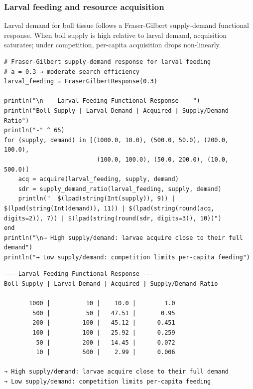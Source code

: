 \subsubsection{Larval feeding and resource acquisition}



\label{5921825355118379258}{}


Larval demand for boll tissue follows a Fraser-Gilbert supply-demand functional response. When boll supply is high relative to larval demand, acquisition saturates; under competition, per-capita acquisition drops non-linearly.




\begin{verbatim}
# Fraser-Gilbert supply-demand response for larval feeding
# a = 0.3 → moderate search efficiency
larval_feeding = FraserGilbertResponse(0.3)

println("\n--- Larval Feeding Functional Response ---")
println("Boll Supply | Larval Demand | Acquired | Supply/Demand Ratio")
println("-" ^ 65)
for (supply, demand) in [(1000.0, 10.0), (500.0, 50.0), (200.0, 100.0),
                          (100.0, 100.0), (50.0, 200.0), (10.0, 500.0)]
    acq = acquire(larval_feeding, supply, demand)
    sdr = supply_demand_ratio(larval_feeding, supply, demand)
    println("  $(lpad(string(Int(supply)), 9)) | $(lpad(string(Int(demand)), 11)) | $(lpad(string(round(acq, digits=2)), 7)) | $(lpad(string(round(sdr, digits=3)), 10))")
end
println("\n→ High supply/demand: larvae acquire close to their full demand")
println("→ Low supply/demand: competition limits per-capita feeding")
\end{verbatim}




\begin{verbatim}
--- Larval Feeding Functional Response ---
Boll Supply | Larval Demand | Acquired | Supply/Demand Ratio
-----------------------------------------------------------------
       1000 |          10 |    10.0 |        1.0
        500 |          50 |   47.51 |       0.95
        200 |         100 |   45.12 |      0.451
        100 |         100 |   25.92 |      0.259
         50 |         200 |   14.45 |      0.072
         10 |         500 |    2.99 |      0.006

→ High supply/demand: larvae acquire close to their full demand
→ Low supply/demand: competition limits per-capita feeding
\end{verbatim}



